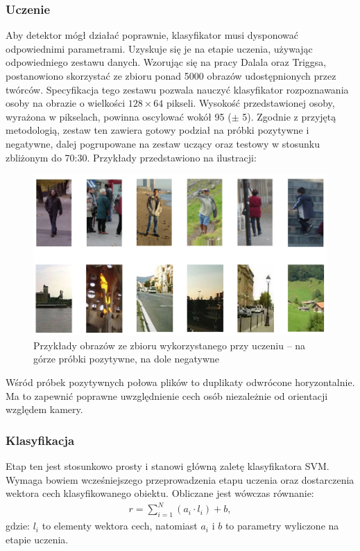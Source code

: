 \subsubsection{Uczenie}

Aby detektor mógł działać poprawnie, klasyfikator musi dysponować odpowiednimi parametrami. 
Uzyskuje się je na etapie uczenia, używając odpowiedniego zestawu danych.
Wzorując się na pracy Dalala oraz Triggsa, postanowiono skorzystać ze zbioru ponad 5000 obrazów udostępnionych przez twórców. 
Specyfikacja tego zestawu pozwala nauczyć klasyfikator rozpoznawania osoby na obrazie o wielkości $128 \times 64$ pikseli. 
Wysokość przedstawionej osoby, wyrażona w pikselach, powinna oscylować wokół 95 ($\pm$ 5). 
Zgodnie z przyjętą metodologią, zestaw ten zawiera gotowy podział na próbki pozytywne i negatywne, dalej pogrupowane na zestaw uczący oraz testowy w stosunku zbliżonym do 70:30. 
Przykłady przedstawiono na ilustracji:

\begin{figure}[h]
	\centering
	\captionsetup{justification=centering,margin=1cm}
	\includegraphics[width=14.5cm]{2_HOG_image_examples.jpg}
	\caption{Przykłady obrazów ze zbioru wykorzystanego przy uczeniu -- na górze próbki pozytywne, na dole negatywne}
	\label{fig:HOG_image_examples}
\end{figure}

Wśród próbek pozytywnych połowa plików to duplikaty odwrócone horyzontalnie. 
Ma to zapewnić poprawne uwzględnienie cech osób niezależnie od orientacji względem kamery.

\subsubsection{Klasyfikacja}
\label{sec:klasyfikacja}
Etap ten jest stosunkowo prosty i stanowi główną zaletę klasyfikatora SVM. 
Wymaga bowiem wcześniejszego przeprowadzenia etapu uczenia oraz dostarczenia wektora cech klasyfikowanego obiektu. 
Obliczane jest wówczas równanie:
\begin{equation}
\label{eq:HOG_classification}
\left.\begin{aligned} 
r=\sum_{i=1}^{N}(a_i\cdot l_i)+b,
\end{aligned}\right.
\end{equation}
gdzie: $l_i$ to elementy wektora cech, natomiast $a_i$ i $b$ to parametry wyliczone na etapie uczenia. 

